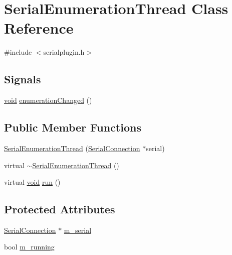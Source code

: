 \hypertarget{class_serial_enumeration_thread}{\section{\-Serial\-Enumeration\-Thread \-Class \-Reference}
\label{class_serial_enumeration_thread}
}


{\ttfamily \#include $<$serialplugin.\-h$>$}

\subsection*{\-Signals}
\begin{DoxyCompactItemize}
\item 
\hyperlink{group___u_a_v_objects_plugin_ga444cf2ff3f0ecbe028adce838d373f5c}{void} \hyperlink{group___serial_plugin_ga18ace5d92ca2899dc35a0fa3b43e016a}{enumeration\-Changed} ()
\end{DoxyCompactItemize}
\subsection*{\-Public \-Member \-Functions}
\begin{DoxyCompactItemize}
\item 
\hyperlink{group___serial_plugin_ga289f1853507d6f6b1bfdd1dd31284c31}{\-Serial\-Enumeration\-Thread} (\hyperlink{class_serial_connection}{\-Serial\-Connection} $\ast$serial)
\item 
virtual \hyperlink{group___serial_plugin_gaf247ad3a1a6b6c85a885aaaa1675cd48}{$\sim$\-Serial\-Enumeration\-Thread} ()
\item 
virtual \hyperlink{group___u_a_v_objects_plugin_ga444cf2ff3f0ecbe028adce838d373f5c}{void} \hyperlink{group___serial_plugin_gab90979605ec84bd0383575c2b10f18d0}{run} ()
\end{DoxyCompactItemize}
\subsection*{\-Protected \-Attributes}
\begin{DoxyCompactItemize}
\item 
\hyperlink{class_serial_connection}{\-Serial\-Connection} $\ast$ \hyperlink{group___serial_plugin_ga5f88185588c5c33293dad0342be60237}{m\-\_\-serial}
\item 
bool \hyperlink{group___serial_plugin_ga1b3398189b91a1994544370f00f8cd00}{m\-\_\-running}
\end{DoxyCompactItemize}



